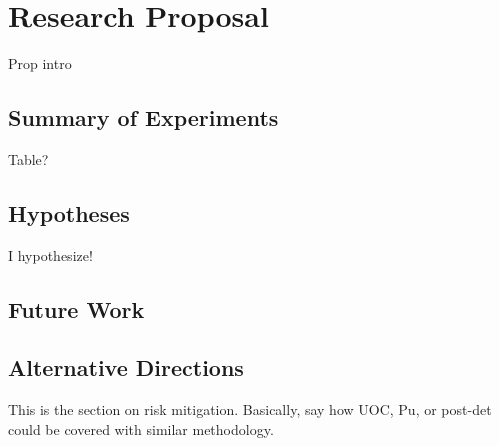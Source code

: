 \chapter{Research Proposal}
\label{ch:proposal}

Prop intro

\section{Summary of Experiments}
\label{sec:summary}

Table?

\section{Hypotheses}
\label{sec:hypotheses}

I hypothesize!

\section{Future Work}
\label{sec:future}


\section{Alternative Directions}
\label{sec:riskmitig}

This is the section on risk mitigation. Basically, say how \gls{UOC}, Pu, or
post-det could be covered with similar methodology.
